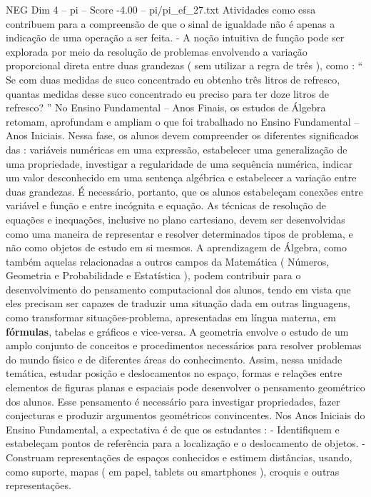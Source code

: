 \begin{textsample}{NEG Dim 4 – pi – Score -4.00 – pi/pi\_ef\_27.txt}
Atividades como essa contribuem para a compreensão de que o sinal de igualdade não é apenas a indicação de uma operação a ser feita. - A noção intuitiva de função pode ser explorada por meio da resolução de problemas envolvendo a variação proporcional direta entre duas grandezas ( sem utilizar a regra de três ), como : “ Se com duas medidas de suco concentrado eu obtenho três litros de refresco, quantas medidas desse suco concentrado eu preciso para ter doze litros de refresco? ” No Ensino Fundamental – Anos Finais, os estudos de Álgebra retomam, aprofundam e ampliam o que foi trabalhado no Ensino Fundamental – Anos Iniciais.
Nessa fase, os alunos devem compreender os diferentes significados das : variáveis numéricas em uma expressão, estabelecer uma generalização de uma propriedade, investigar a regularidade de uma sequência numérica, indicar um valor desconhecido em uma sentença algébrica e estabelecer a variação entre duas grandezas.
É necessário, portanto, que os alunos estabeleçam conexões entre variável e função e entre incógnita e equação.
As técnicas de resolução de equações e inequações, inclusive no plano cartesiano, devem ser desenvolvidas como uma maneira de representar e resolver determinados tipos de problema, e não como objetos de estudo em si mesmos.
A aprendizagem de Álgebra, como também aquelas relacionadas a outros campos da Matemática ( Números, Geometria e Probabilidade e Estatística ), podem contribuir para o desenvolvimento do pensamento computacional dos alunos, tendo em vista que eles precisam ser capazes de traduzir uma situação dada em outras linguagens, como transformar situações-problema, apresentadas em língua materna, em \textbf{fórmulas}, tabelas e gráficos e vice-versa.
A geometria envolve o estudo de um amplo conjunto de conceitos e procedimentos necessários para resolver problemas do mundo físico e de diferentes áreas do conhecimento.
Assim, nessa unidade temática, estudar posição e deslocamentos no espaço, formas e relações entre elementos de figuras planas e espaciais pode desenvolver o pensamento geométrico dos alunos.
Esse pensamento é necessário para investigar propriedades, fazer conjecturas e produzir argumentos geométricos convincentes.
Nos Anos Iniciais do Ensino Fundamental, a expectativa é de que os estudantes : - Identifiquem e estabeleçam pontos de referência para a localização e o deslocamento de objetos. - Construam representações de espaços conhecidos e estimem distâncias, usando, como suporte, mapas ( em papel, tablets ou smartphones ), croquis e outras representações.

\end{textsample}

